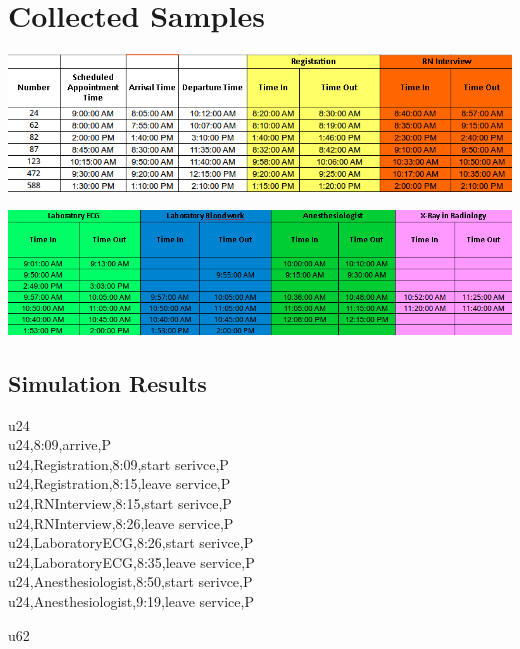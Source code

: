 \documentclass[12pt]{article}
\begin{document}


\newpage
\section{Collected Samples}

\includegraphics[scale=0.5]{sample1.png}

\quad

\includegraphics[scale=0.5]{sample2.png}

\subsection{Simulation Results}

u24\\

u24,8:09,arrive,P\\
u24,Registration,8:09,start serivce,P\\
u24,Registration,8:15,leave service,P\\
u24,RNInterview,8:15,start serivce,P\\
u24,RNInterview,8:26,leave service,P\\
u24,LaboratoryECG,8:26,start serivce,P\\
u24,LaboratoryECG,8:35,leave service,P\\
u24,Anesthesiologist,8:50,start serivce,P\\
u24,Anesthesiologist,9:19,leave service,P\\

\quad

u62\\
\end{document}
